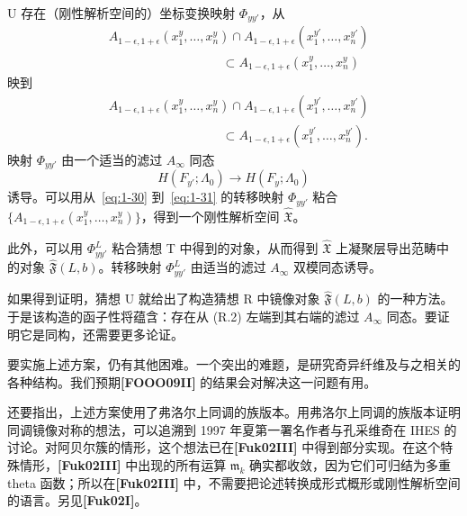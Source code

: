 \begin{conjecture}{U}\label{conj:intro-U}
存在（刚性解析空间的）坐标变换映射 $\Phi_{yy'}$，从
\begin{equation}
\begin{split}
  &A_{1-\epsilon,1+\epsilon}(x_1^y,\ldots,x_n^y)
  \cap A_{1-\epsilon,1+\epsilon}(x_1^{y'},\ldots,x_n^{y'})\\
  &\hspace{9em}\subset
  A_{1-\epsilon,1+\epsilon}(x_1^y,\ldots,x_n^y)
\end{split}
  \tag{1.30}\label{eq:1-30}
\end{equation}
映到
\begin{equation}
\begin{split}
  &A_{1-\epsilon,1+\epsilon}(x_1^y,\ldots,x_n^y)
  \cap A_{1-\epsilon,1+\epsilon}(x_1^{y'},\ldots,x_n^{y'})\\
  &\hspace{9em}\subset
  A_{1-\epsilon,1+\epsilon}(x_1^{y'},\ldots,x_n^{y'}).
\end{split}
  \tag{1.31}\label{eq:1-31}
\end{equation}
映射 $\Phi_{yy'}$ 由一个适当的滤过 $A_\infty$ 同态
\[
  H(F_{y'};\Lambda_0)\longrightarrow H(F_y;\Lambda_0)
\]
诱导。可以用从~\eqref{eq:1-30} 到~\eqref{eq:1-31} 的转移映射
$\Phi_{yy'}$ 粘合
$\{A_{1-\epsilon,1+\epsilon}(x_1^y,\ldots,x_n^y)\}$，得到一个刚性解析空间 $\widehat{\mathfrak X}$。

此外，可以用 $\Phi^L_{yy'}$ 粘合猜想 T 中得到的对象，从而得到
$\widehat{\mathfrak X}$ 上凝聚层导出范畴中的对象
$\hat{\mathfrak F}(L,b)$。转移映射 $\Phi^L_{yy'}$ 由适当的滤过
$A_\infty$ 双模同态诱导。
\end{conjecture}

如果得到证明，猜想 U 就给出了构造猜想 R 中镜像对象
$\hat{\mathfrak F}(L,b)$ 的一种方法。于是该构造的函子性将蕴含：存在从 (R.2) 左端到其右端的滤过 $A_\infty$ 同态。要证明它是同构，还需要更多论证。

要实施上述方案，仍有其他困难。一个突出的难题，是研究奇异纤维及与之相关的各种结构。我们预期\textbf{[FOOO09II]} 的结果会对解决这一问题有用。

还要指出，上述方案使用了弗洛尔上同调的族版本。用弗洛尔上同调的族版本证明同调镜像对称的想法，可以追溯到 1997 年夏第一署名作者与孔采维奇在 IHES 的讨论。对阿贝尔簇的情形，这个想法已在\textbf{[Fuk02III]} 中得到部分实现。在这个特殊情形，\textbf{[Fuk02III]} 中出现的所有运算 $\mathfrak m_k$ 确实都收敛，因为它们可归结为多重 theta 函数；所以在\textbf{[Fuk02III]} 中，不需要把论述转换成形式概形或刚性解析空间的语言。另见\textbf{[Fuk02I]}。

